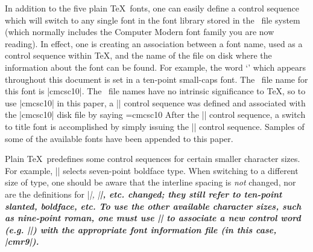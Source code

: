 In addition to the
five plain \TeX\ fonts, one can easily define a control sequence
which will switch to 
any single font in the font library stored in the \Unix\ file system
(which normally includes the Computer Modern font family you are
now reading).  In effect, one is creating an association between
a font name, used as a control sequence within \TeX, and the name
of the file on disk where the information about the font can be found.
For example, the word `\Unix' which appears
throughout this document is set in
a ten-point small-caps
font.  The \Unix\ file name for this font is |cmcsc10|.
The \Unix\ file names have no intrinsic significance to \TeX,
so to use
|cmcsc10| in this paper, a |\csc| control sequence was defined
and associated with the |cmcsc10| disk file
by saying
\begintt
\font\csc=cmcsc10
\endtt
After the |\font| control sequence, a switch to title font
is accomplished by simply issuing the |\csc| control sequence.
Samples of some of the available fonts have been appended to
this paper.

Plain \TeX\ predefines some control sequences for certain
smaller character
sizes.  For example, |\sevenbf| selects {\sevenbf seven-point boldface}
type.  When switching to a different size of type, one should be
aware that the interline spacing is {\sl not\/} changed, nor are
the definitions for |\sl|, |\bf|, etc. changed; they still refer
to ten-point slanted, boldface, etc.
To use the other available character sizes, such as nine-point
roman,
one must use |\font| to
associate a new control word (e.g. |\ninerm|) with the appropriate
font information file (in this case, |cmr9|).

